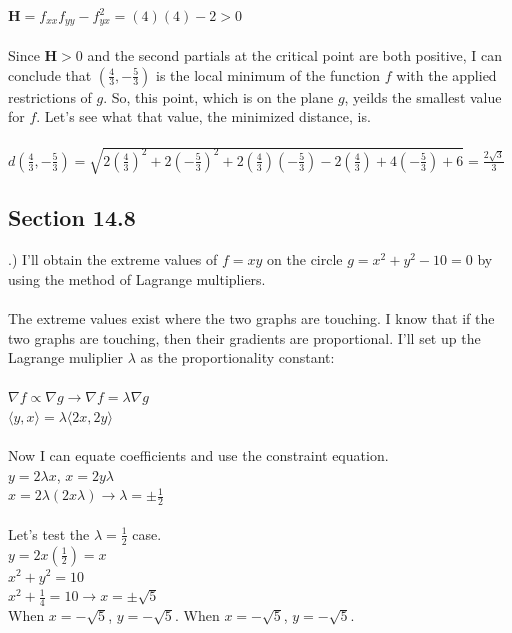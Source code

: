 \documentclass[12pt]{article}
\begin{document}
\noindent $\mathbf{H} = f_{xx}f_{yy} - f_{yx}^{2} = (4)(4) - 2 > 0$\\\\
\noindent Since $\mathbf{H} > 0$ and the second partials at the critical point are both positive, I can conclude that $(\frac{4}{3}, -\frac{5}{3})$
is the local minimum of the function $f$ with the applied restrictions of $g$. So, this point, which is on the plane $g$, yeilds the smallest value for $f$.
Let's see what that value, the minimized distance, is.\\\\
\noindent  $ d(\frac{4}{3}, -\frac{5}{3}) 
=\sqrt{2(\frac{4}{3})^{2}+2(-\frac{5}{3})^{2}+2(\frac{4}{3})(-\frac{5}{3})-2(\frac{4}{3})+4(-\frac{5}{3})+6} = \frac{2\sqrt{3}}{3}$\clearpage


\subsection*{Section 14.8}
.) I'll obtain the extreme values of $f = xy$ on the circle $g = x^{2} + y^{2} -10 = 0$ by using the method of Lagrange multipliers.\\\\
\noindent The extreme values exist where the two graphs are touching. I know that if the two graphs are touching, then their gradients are proportional. 
I'll set up the Lagrange muliplier $\lambda$ as the proportionality constant: \\\\
\noindent $\nabla f \propto \nabla g \rightarrow \nabla f = \lambda \nabla g$\\
\noindent $ \langle y, x\rangle = \lambda \langle 2x, 2y\rangle$\\\\
\noindent Now I can equate coefficients and use the constraint equation.\\
\noindent $y = 2\lambda x$, \hspace{10pt} $x = 2y\lambda$\\
\noindent $x = 2\lambda (2x\lambda) \rightarrow \lambda = \pm \frac{1}{2}$\\\\
\noindent Let's test the $\lambda = \frac{1}{2}$ case.\\
\noindent $y = 2x(\frac{1}{2}) = x$\\
\noindent $x^{2} + y^{2} = 10$\\
\noindent $x^{2} + \frac{1}{4} = 10 \rightarrow x = \pm\sqrt{5}$\\
\noindent When $x = -\sqrt{5}$, $y = -\sqrt{5}$. When $x = -\sqrt{5}$, $y = -\sqrt{5}$.\\\\
\end{document}
